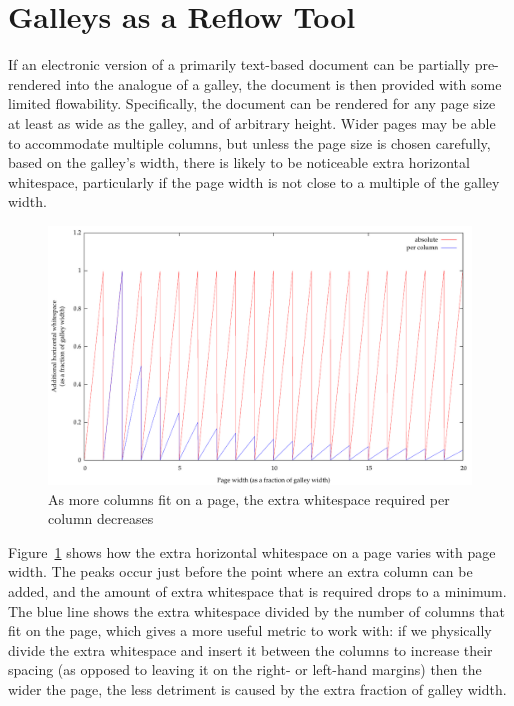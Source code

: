 \section{Galleys as a Reflow Tool}
\label{sec:singlegalleymetric}
If an electronic version of a primarily text-based document can be partially pre-rendered into the analogue of a galley, the document is then provided with some limited flowability. Specifically, the document can be rendered for any page size at least as wide as the galley, and of arbitrary height. Wider pages may be able to accommodate multiple columns, but unless the page size is chosen carefully, based on the galley's width, there is likely to be noticeable extra horizontal whitespace, particularly if the page width is not close to a multiple of the galley width.

\begin{figure}
 \includegraphics[height=\textwidth,angle=90]{gnuplot/1col}
 \caption[Extra whitespace in a single-galley document]{As more columns fit on a page, the extra whitespace required per column decreases}
 \label{fig:sawtooth}
\end{figure}


Figure~\ref{fig:sawtooth} shows how the extra horizontal whitespace on a page varies with page width. The peaks occur just before the point where an extra column can be added, and the amount of extra whitespace that is required drops to a minimum. The blue line shows the extra whitespace divided by the number of columns that fit on the page, which gives a more useful metric to work with: if we physically divide the extra whitespace and insert it between the columns to increase their spacing (as opposed to leaving it on the right- or left-hand margins) then the wider the page, the less detriment is caused by the extra fraction of galley width.

